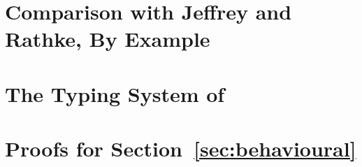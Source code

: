 \documentclass[a4paper,UKenglish]{lipics}
\begin{document}

%
%
{}

\newpage
\appendix 
\section{Comparison with Jeffrey and Rathke, By Example}
\label{app:jandr}


\section{The Typing System of \HOp}
\label{app:types}




\section{Proofs for Section~\ref{sec:behavioural}}
\label{app:beh}

\end{document}
